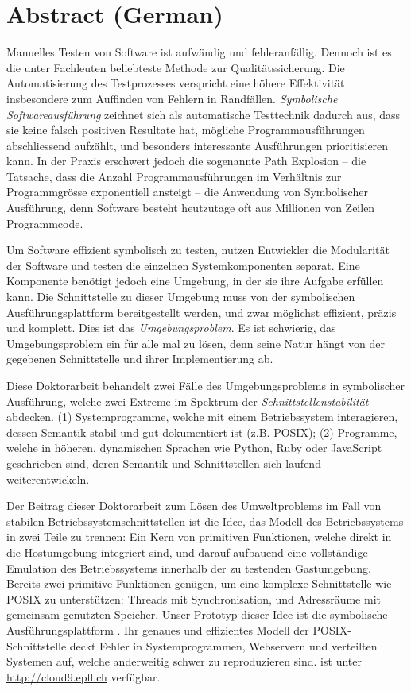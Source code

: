 \chapter*{Abstract (German)}

Manuelles Testen von Software ist aufwändig und fehleranfällig. Dennoch ist es die unter Fachleuten beliebteste Methode zur Qualitätssicherung. Die Automatisierung des Testprozesses verspricht eine höhere Effektivität insbesondere zum Auffinden von Fehlern in Randfällen. \emph{Symbolische Softwareausführung} zeichnet sich als automatische Testtechnik dadurch aus, dass sie keine falsch positiven Resultate hat, mögliche Programmausführungen abschliessend aufzählt, und besonders interessante Ausführungen prioritisieren kann. In der Praxis erschwert jedoch die sogenannte Path Explosion – die Tatsache, dass die Anzahl Programmausführungen im Verhältnis zur Programmgrösse exponentiell ansteigt – die Anwendung von Symbolischer Ausführung, denn Software besteht heutzutage oft aus Millionen von Zeilen Programmcode.

Um Software effizient symbolisch zu testen, nutzen Entwickler die Modularität der Software  und testen die einzelnen Systemkomponenten separat. Eine Komponente benötigt jedoch eine Umgebung, in der sie ihre Aufgabe erfüllen kann. Die Schnittstelle zu dieser Umgebung muss von der symbolischen Ausführungsplattform bereitgestellt werden, und zwar möglichst effizient, präzis und komplett. Dies ist das \emph{Umgebungsproblem}. Es ist schwierig, das Umgebungsproblem ein für alle mal zu lösen, denn seine Natur hängt von der gegebenen Schnittstelle und ihrer Implementierung ab.

Diese Doktorarbeit behandelt zwei Fälle des Umgebungsproblems in symbolischer Ausführung, welche zwei Extreme im Spektrum der \emph{Schnittstellenstabilität} abdecken. (1) Systemprogramme, welche mit einem Betriebssystem interagieren, dessen Semantik stabil und gut dokumentiert ist (z.B. POSIX); (2) Programme, welche in höheren, dynamischen Sprachen wie Python, Ruby oder JavaScript geschrieben sind, deren Semantik und Schnittstellen sich laufend weiterentwickeln.

Der Beitrag dieser Doktorarbeit zum Lösen des Umweltproblems im Fall von stabilen Betriebssystemschnittstellen ist die Idee, das Modell des Betriebssystems in zwei Teile zu trennen: Ein Kern von primitiven Funktionen, welche direkt in die Hostumgebung integriert sind, und darauf aufbauend eine vollständige Emulation des Betriebssystems innerhalb der zu testenden Gastumgebung. Bereits zwei primitive Funktionen genügen, um eine komplexe Schnittstelle wie POSIX zu unterstützen: Threads mit Synchronisation, und Adressräume mit gemeinsam genutzten Speicher. Unser Prototyp dieser Idee ist die symbolische Ausführungsplattform \emph{\cnine}. Ihr genaues und effizientes Modell der POSIX-Schnittstelle deckt Fehler in Systemprogrammen, Webservern und verteilten Systemen auf, welche anderweitig schwer zu reproduzieren sind. \cnine ist unter {\url{http://cloud9.epfl.ch}} verfügbar.

